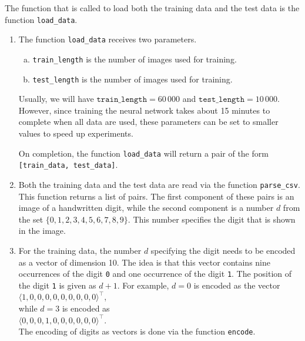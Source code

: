 The function that is called to load both the training data and the test data is the function \texttt{load\_data}.
\begin{enumerate}
\item The function \texttt{load\_data} receives two parameters.
      \begin{enumerate}[(a)]
      \item \texttt{train\_length} is the number of images used for training.
      \item \texttt{test\_length} is the number of images used for training.
      \end{enumerate}
      Usually, we will have $\texttt{train\_length} = 60\,000$ and $\texttt{test\_length} = 10\,000$.
      However, since training the neural network takes about 15 minutes to complete when all data are used,
      these parameters can be set to smaller values to speed up experiments.

      On completion, the function \texttt{load\_data} will return a pair of the form
      \\[0.2cm]
      \hspace*{1.3cm}
      \texttt{[train\_data, test\_data]}.
\item Both the training data and the test data are read via the function \texttt{parse\_csv}.
      This function returns a list of pairs.  The first component of these pairs is an image of a handwritten
      digit, while the second component is a number $d$ from the set $\{0,1,2,3,4,5,6,7,8,9\}$.
      This number specifies the digit that is shown in the image.
\item For the training data, the number $d$ specifying the digit needs to be encoded as a vector of dimension 10.
      The idea is that this vector contains nine occurrences of the digit \texttt{0} and one occurrence of the
      digit \texttt{1}.  The position of the digit \texttt{1} is given as $d+1$.  For example, $d=0$ is encoded
      as the vector
      \\[0.2cm]
      \hspace*{1.3cm}
      $\langle 1, 0, 0, 0, 0, 0, 0, 0, 0, 0 \rangle^\top$,
      \\[0.2cm]
      while $d=3$ is encoded as
      \\[0.2cm]
      \hspace*{1.3cm}
      $\langle 0, 0, 0, 1, 0, 0, 0, 0, 0, 0 \rangle^\top$.
      \\[0.2cm]
      The encoding of digits as vectors is done via the function \texttt{encode}.
\end{enumerate}
